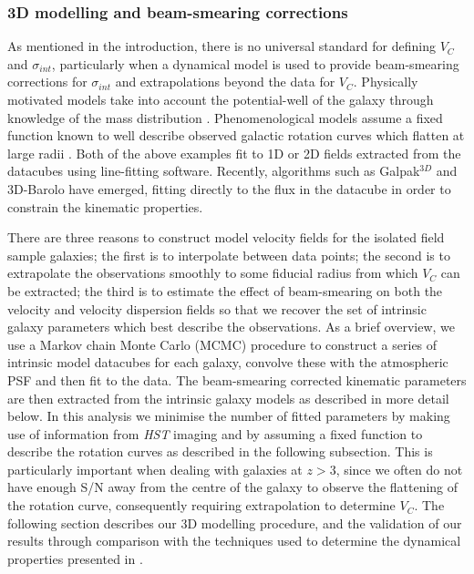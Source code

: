 \documentclass[fleqn,usenatbib]{mn2e}
\begin{document}
\subsubsection{3D modelling and beam-smearing corrections}\label{subsec:3d_modelling}

As mentioned in the introduction, there is no universal standard for defining $V_{C}$ and $\sigma_{int}$, particularly when a dynamical model is used to provide beam-smearing corrections for $\sigma_{int}$ and extrapolations beyond the data for $V_{C}$.
Physically motivated models take into account the potential-well of the galaxy through knowledge of the mass distribution \citep[e.g.][]{Genzel2008,ForsterSchreiber2009,Gnerucci2011,Wisnioski2015,Swinbank2017}.
Phenomenological models assume a fixed function known to well describe observed galactic rotation curves which flatten at large radii \citep[e.g.][]{Epinat2010,Epinat2012,Swinbank2012,Stott2016,Harrison2017}.
Both of the above examples fit to 1D or 2D fields extracted from the datacubes using line-fitting software.
Recently, algorithms such as Galpak$^{3D}$ \citep{Bouche2015} and 3D-Barolo \citep{DiTeodoro2015} have emerged, fitting directly to the flux in the datacube in order to constrain the kinematic properties.

There are three reasons to construct model velocity fields for the isolated field sample galaxies; the first is to interpolate between data points; the second is to extrapolate the observations smoothly to some fiducial radius from which $V_{C}$ can be extracted; the third is to estimate the effect of beam-smearing on both the velocity and velocity dispersion fields so that we recover the set of intrinsic galaxy parameters which best describe the observations.
As a brief overview, we use a Markov chain Monte Carlo (MCMC) procedure to construct a series of intrinsic model datacubes for each galaxy, convolve these with the atmospheric PSF and then fit to the data.
The beam-smearing corrected kinematic parameters are then extracted from the intrinsic galaxy models as described in more detail below.
In this analysis we minimise the number of fitted parameters by making use of information from {\em HST} imaging and by assuming a fixed function to describe the rotation curves as described in the following subsection.    
This is particularly important when dealing with galaxies at $z > 3$, since we often do not have enough S/N away from the centre of the galaxy to observe the flattening of the rotation curve, consequently requiring extrapolation to determine $V_{C}$.  
The following section describes our 3D modelling procedure, and the validation of our results through comparison with the techniques used to determine the dynamical properties presented in \cite{Harrison2017}.
\end{document}
